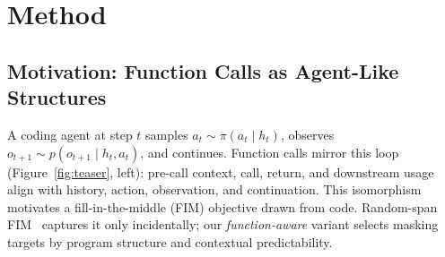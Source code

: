 
\section{Method}
\label{sec:method}
\vspace{-0.5ex}

\subsection{Motivation: Function Calls as Agent-Like Structures}
\label{sec:method:motivation}
A coding agent at step $t$ samples $a_t \sim \pi(a_t \mid h_t)$, observes
$o_{t+1} \sim p(o_{t+1} \mid h_t, a_t)$, and continues. Function calls
mirror this loop (Figure~\ref{fig:teaser}, left): pre-call context, call,
return, and downstream usage align with history, action, observation,
and continuation. This isomorphism motivates a fill-in-the-middle (FIM)
objective drawn from code. Random-span FIM~\citep{qwencoder,
deepseekcoder, starcoder} captures it only incidentally; our
\emph{function-aware} variant selects masking targets by program
structure and contextual predictability.



